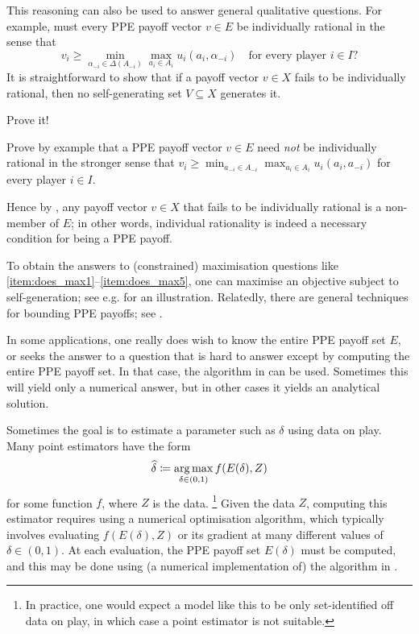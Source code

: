This reasoning can also be used to answer general qualitative questions. For example, must every PPE payoff vector $v \in E$ be individually rational in the sense that
%
\begin{equation*}
	v_i \geq \min_{\alpha_{-i} \in \Delta(A_{-i})} \max_{a_i \in A_i} u_i(a_i,\alpha_{-i})
	\quad \text{for every player $i \in I$?}
\end{equation*}
%
It is straightforward to show that if a payoff vector $v \in X$ fails to be individually rational, then no self-generating set $V \subseteq X$ generates it.

\begin{exercise}
	\label{exercise:ir_ppe_necessary}
	Prove it!
\end{exercise}

\begin{exercise}[S.~Petersen]
	\label{exercise:ir_ppe_necessary_pure}
	Prove by example that a PPE payoff vector $v \in E$ need \emph{not} be individually rational in the stronger sense that $v_i \geq \min_{a_{-i} \in A_{-i}} \max_{a_i \in A_i} u_i(a_i,a_{-i})$ for every player $i \in I$.
\end{exercise}

\noindent Hence by , any payoff vector $v \in X$ that fails to be individually rational is a non-member of $E$; in other words, individual rationality is indeed a necessary condition for being a PPE payoff.

To obtain the answers to (constrained) maximisation questions like \ref{item:does_max1}--\ref{item:does_max5}, one can maximise an objective subject to self-generation; see e.g. \textcite[section~7.7]{MailathSamuelson2006} for an illustration. Relatedly, there are general techniques for bounding PPE payoffs; see \textcite[][chapter~8]{MailathSamuelson2006}.

In some applications, one really does wish to know the entire PPE payoff set $E$, or seeks the answer to a question that is hard to answer except by computing the entire PPE payoff set. In that case, the algorithm in  can be used. Sometimes this will yield only a numerical answer, but in other cases it yields an analytical solution.

Sometimes the goal is to estimate a parameter such as $\delta$ using data on play. Many point estimators have the form
%
\begin{equation*}
	\widehat{\delta}
	\coloneqq \operatorname*{arg\,max}_{\delta \in (0,1)} f(E(\delta),Z)
\end{equation*}
%
for some function $f$, where $Z$ is the data.%
	\footnote{In practice, one would expect a model like this to be only set-identified off data on play, in which case a point estimator is not suitable.}
Given the data $Z$, computing this estimator requires using a numerical optimisation algorithm, which typically involves evaluating $f(E(\delta),Z)$ or its gradient at many different values of $\delta \in (0,1)$. At each evaluation, the PPE payoff set $E(\delta)$ must be computed, and this may be done using (a numerical implementation of) the algorithm in .

